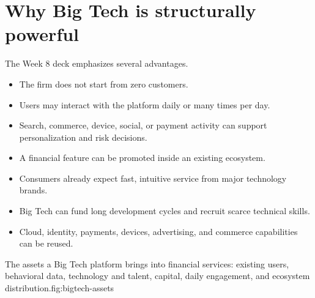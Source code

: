 \section{Why Big Tech is structurally powerful}

The Week 8 deck emphasizes several advantages.

\begin{itemize}
  \item {} The firm does not start from zero customers.
  \item {} Users may interact with the platform daily or many times per day.
  \item {} Search, commerce, device, social, or payment activity can support personalization and risk decisions.
  \item {} A financial feature can be promoted inside an existing ecosystem.
  \item {} Consumers already expect fast, intuitive service from major technology brands.
  \item {} Big Tech can fund long development cycles and recruit scarce technical skills.
  \item {} Cloud, identity, payments, devices, advertising, and commerce capabilities can be reused.
\end{itemize}

\begin{utpfig}{The assets a Big Tech platform brings into financial services: existing users, behavioral data, technology and talent, capital, daily engagement, and ecosystem distribution.}{fig:bigtech-assets}
\end{utpfig}

